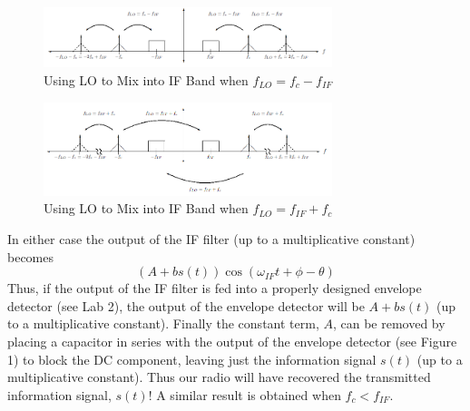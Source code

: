 \documentclass [utf8] {article}
\begin{document}
{	\begin{figure}[H]
		\begin{small}
			\begin{center}
				\includegraphics[width=0.75\textwidth]{figures/Figure9.png}
			\end{center}
			\caption{Using LO to Mix into IF Band when $f_{LO} = f_c − f_{IF}$}
			\label{fig:LO-IF-}
		\end{small}
	\end{figure}
	\begin{figure}[H]
		\begin{small}
			\begin{center}
				\includegraphics[width=0.75\textwidth]{figures/Figure10.png}
			\end{center}
			\caption{Using LO to Mix into IF Band when $f_{LO} = f_{IF} + f_c$}
			\label{fig:LO-IF+}
		\end{small}
	\end{figure}
	
	In either case the output of the IF filter (up to a multiplicative constant) becomes
	$$(A+bs(t))\cos(\omega_{IF}t+\phi-\theta)$$
	Thus, if the output of the IF filter is fed into a properly designed envelope detector (see Lab 2), the output of the envelope detector will be $A + bs(t)$ (up to a multiplicative constant). Finally the constant term, $A$, can be removed by placing a capacitor in series with the output of the envelope detector (see Figure 1) to block the DC component, leaving just the information signal $s(t)$ (up to a multiplicative constant). Thus our radio will have recovered the transmitted information signal, $s(t)$! A similar result is obtained when $f_c < f_{IF}$.
}
\end{document}

